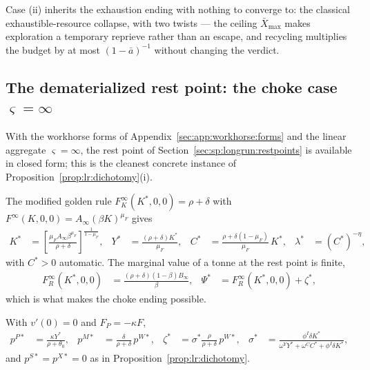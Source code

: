 Case (ii) inherits the exhaustion ending with nothing to converge to: the classical exhaustible-resource collapse, with two twists --- the ceiling $\bar X_{\max}$ makes exploration a temporary reprieve rather than an escape, and recycling multiplies the budget by at most $\left(1-\bar a\right)^{-1}$ without changing the verdict.

\subsection{The dematerialized rest point: the choke case $\varsigma=\infty$}\label{sec:app:workhorse:restpoint}

With the workhorse forms of Appendix~\ref{sec:app:workhorse:forms} and the linear aggregate $\varsigma=\infty$, the rest point of Section~\ref{sec:sp:longrun:restpoints} is available in closed form; this is the cleanest concrete instance of Proposition~\ref{prop:lr:dichotomy}(i).

 The modified golden rule $F^\infty_K\left(K^*,0,0\right)=\rho+\delta$ with $F^\infty\left(K,0,0\right)=A_\infty\left(\beta K\right)^{\mu_F}$ gives
\begin{align}
K^* &= \left[\frac{\mu_F A_\infty\beta^{\mu_F}}{\rho+\delta}\right]^{\frac{1}{1-\mu_F}},
&
Y^* &= \frac{\left(\rho+\delta\right)K^*}{\mu_F},
&
C^* &= \frac{\rho+\delta\left(1-\mu_F\right)}{\mu_F}\,K^*,
&
\lambda^* &= \left(C^*\right)^{-\eta},
\label{eq:app:wh:mgr}
\end{align}
with $C^*>0$ automatic. The marginal value of a tonne at the rest point is finite,
\begin{align}
F^\infty_R\left(K^*,0,0\right) &= \frac{\left(\rho+\delta\right)\left(1-\beta\right)B_\infty}{\beta},
&
\Psi^* &= F^\infty_R\left(K^*,0,0\right)+\zeta^*,
\label{eq:app:wh:FRstar}
\end{align}
which is what makes the choke ending possible.

 With $v'\left(0\right)=0$ and $F_P=-\kappa F$,
\begin{align}
p^{P*} &= \frac{\kappa Y^*}{\rho+\theta_0},
&
p^{M*} &= \frac{\delta}{\rho+\delta}\,p^{W*},
&
\zeta^* &= \sigma^*\frac{\rho}{\rho+\delta}\,p^{W*},
&
\sigma^* &= \frac{\phi^I\delta K^*}{\omega^YY^*+\omega^CC^*+\phi^I\delta K^*},
\label{eq:app:wh:restprices}
\end{align}
and $p^{S*}=p^{X*}=0$ as in Proposition~\ref{prop:lr:dichotomy}.

